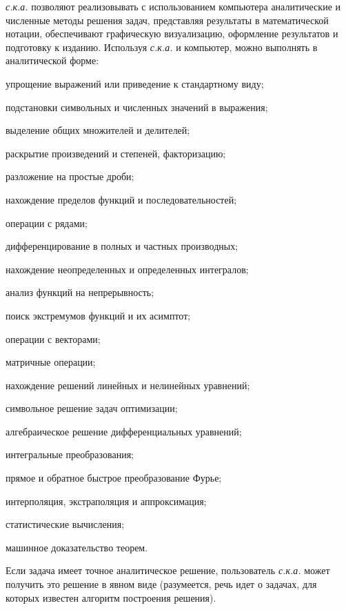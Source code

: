 \textit{с.к.а.} позволяют реализовывать с использованием компьютера аналитические и численные методы решения задач, представляя результаты в математической нотации, обеспечивают графическую визуализацию, оформление результатов и подготовку к изданию. 
Используя \textit{с.к.а.} и компьютер, можно выполнять в аналитической форме:

\begin{textitemize}
	\item упрощение выражений или приведение к стандартному виду;
	\item подстановки символьных и численных значений в выражения; 
	\item выделение общих множителей и делителей;
	\item раскрытие произведений и степеней, факторизацию;
	\item разложение на простые дроби;
	\item нахождение пределов функций и последовательностей; 
	\item операции с рядами;
	\item дифференцирование в полных и частных производных;
	\item нахождение неопределенных и определенных интегралов;
	\item анализ функций на непрерывность;
	\item поиск экстремумов функций и их асимптот;
	\item операции с векторами;
	\item матричные операции;
	\item нахождение решений линейных и нелинейных уравнений;
	\item символьное решение задач оптимизации;
	\item алгебраическое решение дифференциальных уравнений;
	\item интегральные преобразования;
	\item прямое и обратное быстрое преобразование Фурье;
	\item интерполяция, экстраполяция и аппроксимация;
	\item статистические вычисления;
	\item машинное доказательство теорем.
\end{textitemize}

Если задача имеет точное аналитическое решение, пользователь \textit{с.к.а.} может получить это решение в явном виде (разумеется, речь идет о задачах, для которых известен алгоритм построения решения).

